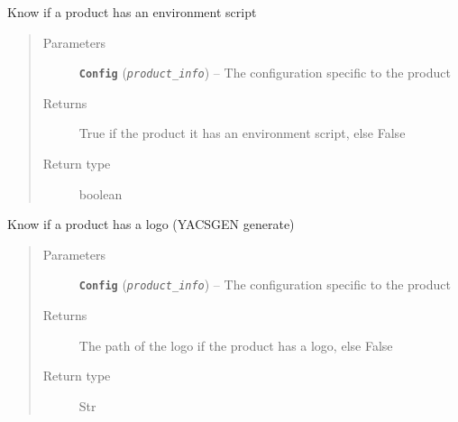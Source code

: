 \documentclass[a4paper,10pt,english]{sphinxmanual}
\begin{document}

\begin{fulllineitems}
\label{commands/apidoc/src:src.product.product_has_env_script}
Know if a product has an environment script
\begin{quote}\begin{description}
\item[{Parameters}] \leavevmode
\textbf{\texttt{Config}} (\emph{\texttt{product\_info}}) -- The configuration specific to 
the product

\item[{Returns}] \leavevmode
True if the product it has an environment script, else False

\item[{Return type}] \leavevmode
boolean

\end{description}\end{quote}

\end{fulllineitems}


\begin{fulllineitems}
\label{commands/apidoc/src:src.product.product_has_logo}
Know if a product has a logo (YACSGEN generate)
\begin{quote}\begin{description}
\item[{Parameters}] \leavevmode
\textbf{\texttt{Config}} (\emph{\texttt{product\_info}}) -- The configuration specific to 
the product

\item[{Returns}] \leavevmode
The path of the logo if the product has a logo, else False

\item[{Return type}] \leavevmode
Str

\end{description}\end{quote}

\end{fulllineitems}

\end{document}
